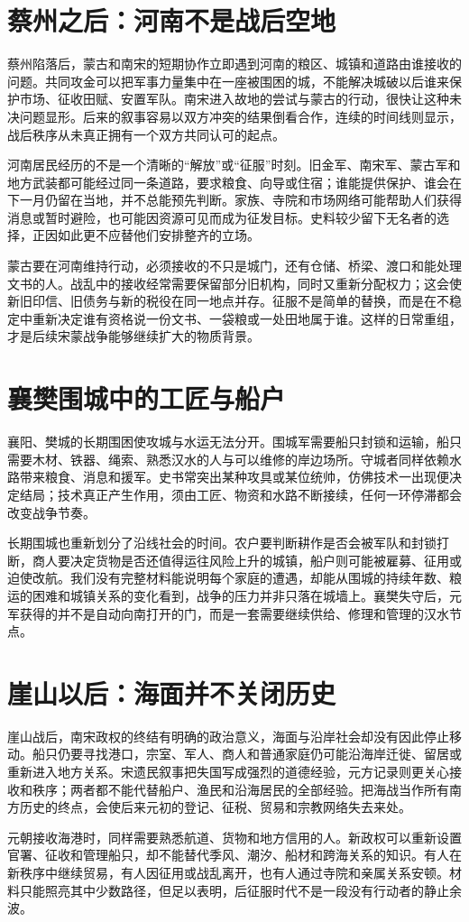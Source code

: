 \section{蔡州之后：河南不是战后空地}

蔡州陷落后，蒙古和南宋的短期协作立即遇到河南的粮区、城镇和道路由谁接收的问题。共同攻金可以把军事力量集中在一座被围困的城，不能解决城破以后谁来保护市场、征收田赋、安置军队。南宋进入故地的尝试与蒙古的行动，很快让这种未决问题显形。后来的叙事容易以双方冲突的结果倒看合作，连续的时间线则显示，战后秩序从未真正拥有一个双方共同认可的起点。

河南居民经历的不是一个清晰的“解放”或“征服”时刻。旧金军、南宋军、蒙古军和地方武装都可能经过同一条道路，要求粮食、向导或住宿；谁能提供保护、谁会在下一月仍留在当地，并不总能预先判断。家族、寺院和市场网络可能帮助人们获得消息或暂时避险，也可能因资源可见而成为征发目标。史料较少留下无名者的选择，正因如此更不应替他们安排整齐的立场。

蒙古要在河南维持行动，必须接收的不只是城门，还有仓储、桥梁、渡口和能处理文书的人。战乱中的接收经常需要保留部分旧机构，同时又重新分配权力；这会使新旧印信、旧债务与新的税役在同一地点并存。征服不是简单的替换，而是在不稳定中重新决定谁有资格说一份文书、一袋粮或一处田地属于谁。这样的日常重组，才是后续宋蒙战争能够继续扩大的物质背景。

\section{襄樊围城中的工匠与船户}

襄阳、樊城的长期围困使攻城与水运无法分开。围城军需要船只封锁和运输，船只需要木材、铁器、绳索、熟悉汉水的人与可以维修的岸边场所。守城者同样依赖水路带来粮食、消息和援军。史书常突出某种攻具或某位统帅，仿佛技术一出现便决定结局；技术真正产生作用，须由工匠、物资和水路不断接续，任何一环停滞都会改变战争节奏。

长期围城也重新划分了沿线社会的时间。农户要判断耕作是否会被军队和封锁打断，商人要决定货物是否还值得运往风险上升的城镇，船户则可能被雇募、征用或迫使改航。我们没有完整材料能说明每个家庭的遭遇，却能从围城的持续年数、粮运的困难和城镇关系的变化看到，战争的压力并非只落在城墙上。襄樊失守后，元军获得的并不是自动向南打开的门，而是一套需要继续供给、修理和管理的汉水节点。

\section{崖山以后：海面并不关闭历史}

崖山战后，南宋政权的终结有明确的政治意义，海面与沿岸社会却没有因此停止移动。船只仍要寻找港口，宗室、军人、商人和普通家庭仍可能沿海岸迁徙、留居或重新进入地方关系。宋遗民叙事把失国写成强烈的道德经验，元方记录则更关心接收和秩序；两者都不能代替船户、渔民和沿海居民的全部经验。把海战当作所有南方历史的终点，会使后来元初的登记、征税、贸易和宗教网络失去来处。

元朝接收海港时，同样需要熟悉航道、货物和地方信用的人。新政权可以重新设置官署、征收和管理船只，却不能替代季风、潮汐、船材和跨海关系的知识。有人在新秩序中继续贸易，有人因征用或战乱离开，也有人通过寺院和亲属关系安顿。材料只能照亮其中少数路径，但足以表明，后征服时代不是一段没有行动者的静止余波。
